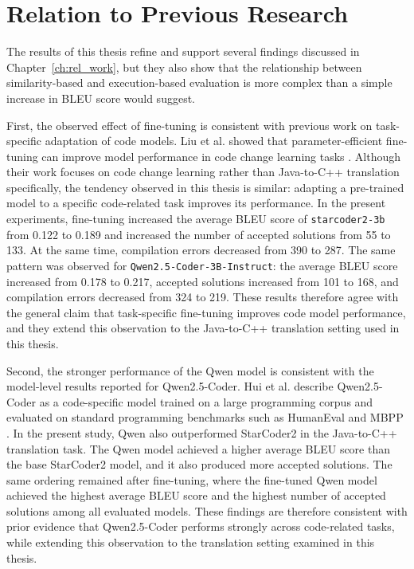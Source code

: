 \section{Relation to Previous Research}


The results of this thesis refine and support several findings discussed in
Chapter~\ref{ch:rel_work}, but they also show that the relationship between
similarity-based and execution-based evaluation is more complex than a simple
increase in BLEU score would suggest.

First, the observed effect of fine-tuning is consistent with previous work on
task-specific adaptation of code models. Liu et al. showed that
parameter-efficient fine-tuning can improve model performance in code change
learning tasks \cite{peft_code}. Although their work focuses on code change
learning rather than Java-to-C++ translation specifically, the tendency observed
in this thesis is similar: adapting a pre-trained model to a specific code-related
task improves its performance. In the present experiments, fine-tuning increased
the average BLEU score of \texttt{starcoder2-3b} from 0.122 to 0.189 and
increased the number of accepted solutions from 55 to 133. At the same time,
compilation errors decreased from 390 to 287. The same pattern was observed for
\texttt{Qwen2.5-Coder-3B-Instruct}: the average BLEU score increased from
0.178 to 0.217, accepted solutions increased from 101 to 168, and compilation
errors decreased from 324 to 219. These results therefore agree with the general
claim that task-specific fine-tuning improves code model performance, and they
extend this observation to the Java-to-C++ translation setting used in this thesis.

Second, the stronger performance of the Qwen model is consistent with the
model-level results reported for Qwen2.5-Coder. Hui et al. describe
Qwen2.5-Coder as a code-specific model trained on a large programming corpus
and evaluated on standard programming benchmarks such as HumanEval and MBPP
\cite{qwen_coder}. In the present study, Qwen also outperformed StarCoder2 in
the Java-to-C++ translation task. The Qwen model achieved a higher average BLEU score than the base StarCoder2 model, and it also
produced more accepted solutions. The same ordering remained after fine-tuning,
where the fine-tuned Qwen model achieved the highest average BLEU score and the
highest number of accepted solutions among all evaluated models. These findings are therefore consistent with prior evidence that Qwen2.5-Coder performs strongly across code-related
tasks, while extending this observation to the translation setting examined in
this thesis.

